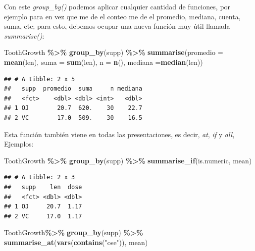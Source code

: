 \documentclass[
]{book}
\newenvironment{Shaded}{\begin{snugshade}}{\end{snugshade}}
\newcommand{\AttributeTok}[1]{\textcolor[rgb]{0.13,0.29,0.53}{#1}}
\newcommand{\FunctionTok}[1]{\textcolor[rgb]{0.13,0.29,0.53}{\textbf{#1}}}
\newcommand{\NormalTok}[1]{#1}
\newcommand{\SpecialCharTok}[1]{\textcolor[rgb]{0.81,0.36,0.00}{\textbf{#1}}}
\newcommand{\StringTok}[1]{\textcolor[rgb]{0.31,0.60,0.02}{#1}}
\begin{document}
\hfill\break
Con este \emph{group\_by()} podemos aplicar cualquier cantidad de funciones, por ejemplo para en vez que me de el conteo me de el promedio, mediana, cuenta, suma, etc; para esto, debemos ocupar una nueva función muy útil llamada \emph{summarise()}:

\begin{Shaded}
\begin{Highlighting}[]
\NormalTok{ToothGrowth }\SpecialCharTok{\%\textgreater{}\%} \FunctionTok{group\_by}\NormalTok{(supp) }\SpecialCharTok{\%\textgreater{}\%} \FunctionTok{summarise}\NormalTok{(}\AttributeTok{promedio =} \FunctionTok{mean}\NormalTok{(len), }\AttributeTok{suma =} \FunctionTok{sum}\NormalTok{(len),}
                                             \AttributeTok{n =} \FunctionTok{n}\NormalTok{(), }\AttributeTok{mediana =}\FunctionTok{median}\NormalTok{(len))}
\end{Highlighting}
\end{Shaded}

\begin{verbatim}
## # A tibble: 2 x 5
##   supp  promedio  suma     n mediana
##   <fct>    <dbl> <dbl> <int>   <dbl>
## 1 OJ        20.7  620.    30    22.7
## 2 VC        17.0  509.    30    16.5
\end{verbatim}

\hfill\break
Esta función también viene en todas las presentaciones, es decir, \emph{at}, \emph{if} y \emph{all}, Ejemplos:

\begin{Shaded}
\begin{Highlighting}[]
\NormalTok{ToothGrowth }\SpecialCharTok{\%\textgreater{}\%}  \FunctionTok{group\_by}\NormalTok{(supp) }\SpecialCharTok{\%\textgreater{}\%} \FunctionTok{summarise\_if}\NormalTok{(is.numeric, mean)}
\end{Highlighting}
\end{Shaded}

\begin{verbatim}
## # A tibble: 2 x 3
##   supp    len  dose
##   <fct> <dbl> <dbl>
## 1 OJ     20.7  1.17
## 2 VC     17.0  1.17
\end{verbatim}

\begin{Shaded}
\begin{Highlighting}[]
\NormalTok{ToothGrowth}\SpecialCharTok{\%\textgreater{}\%}  \FunctionTok{group\_by}\NormalTok{(supp) }\SpecialCharTok{\%\textgreater{}\%} \FunctionTok{summarise\_at}\NormalTok{(}\FunctionTok{vars}\NormalTok{(}\FunctionTok{contains}\NormalTok{(}\StringTok{"ose"}\NormalTok{)), mean)}
\end{Highlighting}
\end{Shaded}
\end{document}
